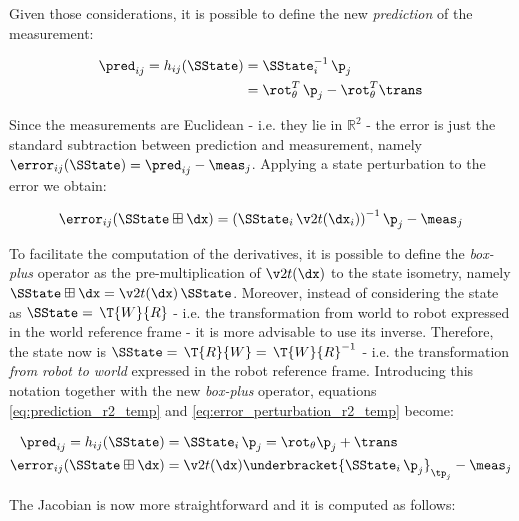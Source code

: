 Given those considerations, it is possible to define the new \textit{prediction} of the measurement:

\begin{align}
    \pred_{ij} = h_{ij}(\SState) &= \SState_i^{-1}\,\p_j \nonumber \\
    &= \rot_{\theta}^T\,\p_j - \rot_{\theta}^T\trans
    \label{eq:prediction_r2_temp}
\end{align}

Since the measurements are Euclidean - i.e. they lie in $\mathbb{R}^2$ - the error is just the standard subtraction between prediction and measurement, namely $\error_{ij}(\SState) = \pred_{ij} - \meas_j$. Applying a state perturbation to the error we obtain:

\begin{equation}
    \label{eq:error_perturbation_r2_temp}
    \error_{ij}(\SState \boxplus \dx) = \left(\SState_i\,\v2t(\dx_i)\right)^{-1}\p_j - \meas_j
\end{equation}

\noindent To facilitate the computation of the derivatives, it is possible to define the \textit{box-plus} operator as the pre-multiplication of $\v2t(\dx)$ to the state isometry, namely $\SState \boxplus \dx = \v2t(\dx)\,\SState$. Moreover, instead of considering the state as $\SState = \,\T{W}{R}$ - i.e. the transformation from world to robot expressed in the world reference frame - it is more advisable to use its inverse. Therefore, the state now is $\SState = \,\T{R}{W} = \,\T{W}{R}^{-1}$ - i.e. the transformation \textit{from robot to world} expressed in the robot reference frame. Introducing this notation together with the new \textit{box-plus} operator, equations \ref{eq:prediction_r2_temp} and \ref{eq:error_perturbation_r2_temp} become:

\begin{align}
    \label{eq:prediction_r2}
    \pred_{ij} = h_{ij}(\SState) &= \SState_i \, \p_j = \rot_{\theta} \p_j + \trans \\
    \label{eq:error_perturbation_r2}
    \error_{ij}(\SState \boxplus \dx) &= \v2t(\dx) \underbracket{\SState_i\, \p_j}_{\tp_j} - \meas_j
\end{align}

\noindent The Jacobian is now more straightforward and it is computed as follows:

